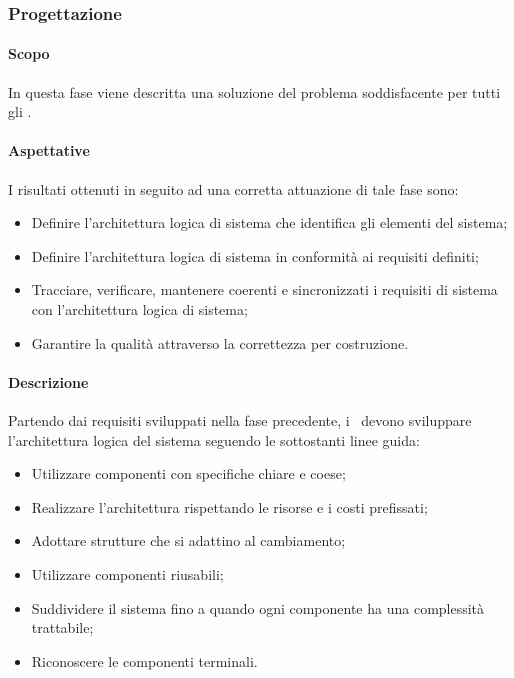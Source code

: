 \documentclass[../NormeDiProgetto.tex]{subfiles}
\begin{document}
		\subsubsection{Progettazione}
			\paragraph{Scopo\\}
				In questa fase viene descritta una soluzione del problema soddisfacente per tutti
				gli .
			\paragraph{Aspettative\\}
				I risultati ottenuti in seguito ad una corretta attuazione di tale fase sono:
				\begin{itemize}
					\item Definire l'architettura logica di sistema che identifica gli elementi
					del sistema;
					\item Definire l'architettura logica di sistema in conformità ai requisiti
					definiti;
					\item Tracciare, verificare, mantenere coerenti e sincronizzati i requisiti di sistema con
					l'architettura logica di sistema;
					\item Garantire la qualità attraverso la correttezza per costruzione.
				\end{itemize}
			\paragraph{Descrizione\\}
				Partendo dai requisiti sviluppati nella fase precedente, i \progettisti\ devono
				sviluppare l'architettura logica del sistema seguendo le sottostanti linee guida:
				\begin{itemize}
					\item Utilizzare componenti con specifiche chiare e coese;
					\item Realizzare l'architettura rispettando le risorse e i costi prefissati;
					\item Adottare strutture che si adattino al cambiamento;
					\item Utilizzare componenti riusabili;
					\item Suddividere il sistema fino a quando ogni componente ha una
					complessità trattabile;
					\item Riconoscere le componenti terminali.
				\end{itemize}
\end{document}
